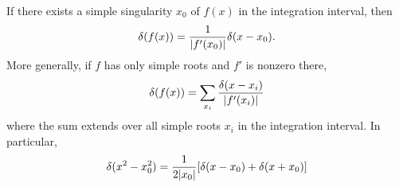 If there exists a simple singularity $x_0$ of $f(x)$ in the
integration interval, then
\begin{equation}
 \delta (f(x))={1\over \vert f'(x_0)\vert }\delta(x-x_0)
.
 \end{equation}
More generally,  if $f$ has only simple roots and $f'$ is nonzero there,
\begin{equation}
 \delta (f(x))=\sum_{x_i}{\delta(x-x_i)\over \vert f'(x_i)\vert }
\label{2011-m-distdp1}
 \end{equation}
where the sum extends over all simple roots $x_i$ in
the integration interval.
In particular,
 \begin{equation}
 \delta (x^2-x_0^2)={1\over 2\vert x_0\vert }[\delta (x-x_0)+\delta
 (x+x_0)] \end{equation}
